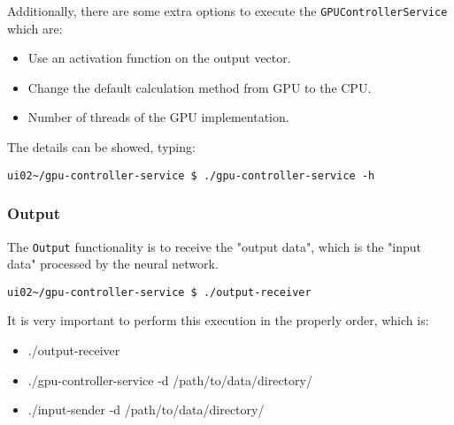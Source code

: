 Additionally, there are some extra options to execute the \texttt{GPUControllerService}
which are:
\begin{itemize}
    \item Use an activation function on the output vector.
    \item Change the default calculation method from GPU to the CPU.
    \item Number of threads of the GPU implementation.
\end{itemize}

The details can be showed, typing:
\begin{verbatim}
ui02~/gpu-controller-service $ ./gpu-controller-service -h
\end{verbatim}

\subsubsection*{Output}

The \texttt{Output} functionality is to receive the "output data",
which is the "input data" processed by the neural network.

\begin{verbatim}
ui02~/gpu-controller-service $ ./output-receiver
\end{verbatim}

It is very important to perform this execution in the properly order,
which is:
\begin{itemize}
    \item ./output-receiver
    \item ./gpu-controller-service -d /path/to/data/directory/
    \item ./input-sender -d /path/to/data/directory/
\end{itemize}
